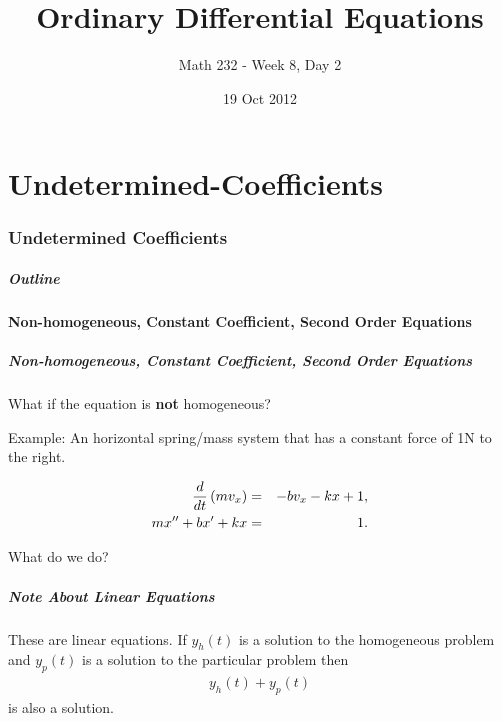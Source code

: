 \part{Undetermined-Coefficients}
\section{Undetermined Coefficients}

\title{Ordinary Differential Equations}
\subtitle{Math 232 - Week 8, Day 2}
\date{19 Oct 2012}

\begin{frame}
  \titlepage
\end{frame}

\begin{frame}
  \frametitle{Outline}
\end{frame}


\subsection{Non-homogeneous, Constant Coefficient, Second Order Equations}


\begin{frame}
  \frametitle{Non-homogeneous, Constant Coefficient, Second Order
    Equations}
  What if the equation is \textbf{not} homogeneous?

  Example: An horizontal spring/mass system that has a constant force
  of 1N to the right.

  \begin{eqnarray*}
    \frac{d}{dt} \left( m v_x \right) & = & -b v_x - kx + 1, \\
    m x'' + bx' + kx & = & 1.
  \end{eqnarray*}

  What do we do?


\end{frame}


\begin{frame}
  \frametitle{Note About Linear Equations}

  These are linear equations. If $y_h(t)$ is a solution to the
  homogeneous problem and $y_p(t)$ is a solution to the particular
  problem then
  \begin{eqnarray*}
    y_h(t) + y_p(t)
  \end{eqnarray*}
  is also a solution.

\end{frame}


